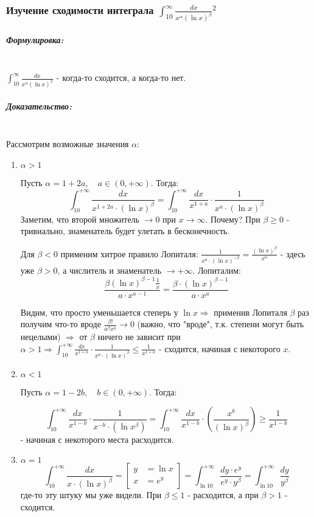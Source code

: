 \documentclass{article}
\let\vanillasubparagraph\subparagraph
\renewcommand{\subparagraph}[1]{\vanillasubparagraph{#1}\mbox{}\\}
\begin{document}
\subsubsection{Изучение сходимости интеграла \texorpdfstring{$\int_{10}^\infty \frac{dx}{x^\alpha (\ln x)^\beta}$}{int [10, inf] dx/x\^a(ln x)\^b}\texorpdfstring{$^2$}{}}


\subparagraph{Формулировка:}

$\int_{10}^\infty \frac{dx}{x^\alpha (\ln x)^\beta}$ - когда-то сходится, а когда-то нет.

\subparagraph{Доказательство:}

Рассмотрим возможные значения $\alpha$: 

\begin{enumerate}
    \item $\alpha > 1$

        Пусть $\alpha = 1 + 2a, \quad a \in (0, +\infty)$. Тогда: 
        $$
        \int_{10}^{+\infty}\frac{dx}{x^{1 + 2a} \cdot (\ln{x})^\beta} = \int_{10}^{+\infty} \frac{dx}{x^{1 + a}} \cdot \frac{1}{x^a \cdot (\ln{x})^\beta}
        $$
        Заметим, что второй множитель $\to 0$ при $x\to \infty$. Почему? При $\beta \geq 0$ - тривиально, знаменатель будет улетать в бесконечность. 

        Для $\beta < 0$ применим хитрое правило Лопиталя: 
        $\frac{1}{x^a \cdot (\ln{x})^{-\beta}} = \frac {(\ln{x})^\beta} {x^\alpha}$ - здесь уже $\beta > 0$, а числитель и знаменатель $\to +\infty$. Лопиталим:
        $$
        \frac{\beta(\ln{x})^{\beta - 1} \frac{1}{x}}{a\cdot x^{a - 1}} = \frac{\beta \cdot (\ln{x})^{\beta - 1}} {a \cdot x^a}
        $$

        Видим, что просто уменьшается степерь у $\ln{x} \Rightarrow $ применив Лопиталя $\beta$ раз получим что-то вроде $\frac{\beta!}{a^\beta x^a} \to 0$ (важно, что "вроде", т.к. степени могут быть нецелыми) $\Rightarrow$ от $\beta$ ничего не зависит при $\alpha > 1 \Rightarrow \int_{10}^{+\infty} \frac{dx}{x^{1 + a}} \cdot \frac{1}{x^a \cdot (\ln{x})^\beta} \leq \frac{1}{x^{1 + a}}$ - сходится, начиная с некоторого $x$. 
    \item $\alpha < 1$

        Пусть $\alpha = 1 - 2b, \quad b \in  (0, +\infty)$. Тогда:

        $$
        \int_{10}^{+\infty} \frac{dx}{x^{1-b}} \cdot \frac{1}{x^{-b} \cdot (\ln{x}^\beta)} = \int_{10}^{+\infty}\frac{dx}{x^{1 - b}} \cdot \left(\frac{x^b}{(\ln{x})^\beta}\right) \geq \frac{1}{x^{1 - b}}
        $$
        - начиная с некоторого места расходится. 
    \item $\alpha = 1$
        $$
        \int_{10}^{+\infty}\frac{dx}{x \cdot (\ln{x})^\beta} = \left[
        \begin{alignedat}{2}
            y &= \ln{x} \\
            x &= e^{y} \\
        \end{alignedat}
    \right] = \int_{\ln{10}}^{+\infty} \frac{dy\cdot e^y} {e^y \cdot y^\beta} = \int_{\ln{10}} ^{+\infty} \frac{dy}{y^\beta}
        $$
        где-то эту штуку мы уже видели. При $\beta \leq 1$ - расходится, а при $\beta > 1$ - сходится.
\end{enumerate}
\end{document}
